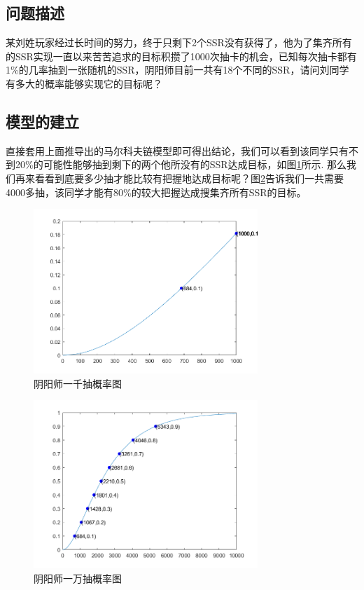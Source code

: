 \documentclass[10pt,journal,compsoc]{IEEEtran}
\begin{document}
\subsection{问题描述}
某刘姓玩家经过长时间的努力，终于只剩下2个SSR没有获得了，他为了集齐所有的SSR实现一直以来苦苦追求的目标积攒了1000次抽卡的机会，已知每次抽卡都有1\%的几率抽到一张随机的SSR，阴阳师目前一共有18个不同的SSR，请问刘同学有多大的概率能够实现它的目标呢？

\subsection{模型的建立}
直接套用上面推导出的马尔科夫链模型即可得出结论，我们可以看到该同学只有不到20\%的可能性能够抽到剩下的两个他所没有的SSR达成目标，如图\ref{fig:yys1k}所示. 那么我们再来看看到底要多少抽才能比较有把握地达成目标呢？图\ref{fig:yys1w}告诉我们一共需要4000多抽，该同学才能有80\%的较大把握达成搜集齐所有SSR的目标。

\begin{figure}[H]
  \centering
  \includegraphics[width=20pc]{img/yys1k.png}
  \caption{阴阳师一千抽概率图}
  \label{fig:yys1k}
\end{figure}

\begin{figure}[H]
  \centering
  \includegraphics[width=20pc]{img/yys1w.png}
  \caption{阴阳师一万抽概率图}
  \label{fig:yys1w}
\end{figure}
\end{document}

